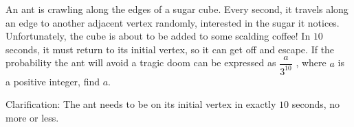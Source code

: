 An ant is crawling along the edges of a sugar cube. Every second, it travels along an edge to another adjacent vertex randomly, interested in the sugar it notices. Unfortunately, the cube is about to be added to some scalding coffee! In $10$ seconds, it must return to its initial vertex, so it can get off and escape. If the probability the ant will avoid a tragic doom can be expressed as $\dfrac{a}{3^{10}}$ , where $a$ is a positive integer, find $a$.

Clarification: The ant needs to be on its initial vertex in exactly $10$ seconds, no more or less.
